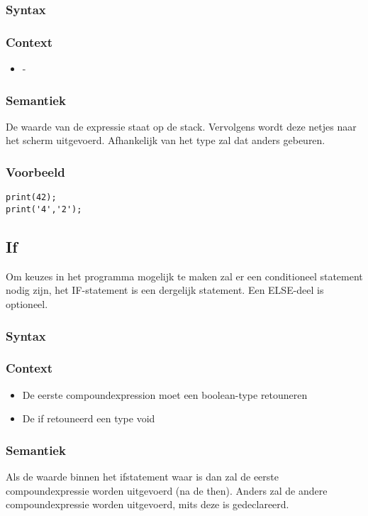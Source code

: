 \documentclass[]{article}
\begin{document}
\subsubsection{Syntax}

\subsubsection{Context}
\begin{itemize}
\item -
\end{itemize}
\subsubsection{Semantiek}
De waarde van de expressie staat op de stack. Vervolgens wordt deze netjes naar het scherm uitgevoerd. Afhankelijk van het type zal dat anders gebeuren. 
\subsubsection{Voorbeeld}
\begin{lstlisting}[style=SELMA]
print(42);
print('4','2');
\end{lstlisting}

\subsection{If}
Om keuzes in het programma mogelijk te maken zal er een conditioneel statement nodig zijn, het IF-statement is een dergelijk statement. Een ELSE-deel is optioneel.
\subsubsection{Syntax}

\subsubsection{Context}
\begin{itemize}
\item De eerste compoundexpression moet een boolean-type retouneren
\item De if retouneerd een type void
\end{itemize}
\subsubsection{Semantiek}
Als de waarde binnen het ifstatement waar is dan zal de eerste compoundexpressie worden uitgevoerd (na de then). Anders zal de andere compoundexpressie worden uitgevoerd, mits deze is gedeclareerd.
\end{document}
